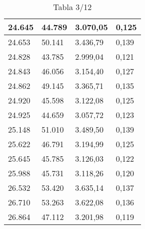 \begin{table}[H]
{\begin{tabular}{| l | l | l |l |}
24.645	&	44.789	&	3.070,05	&	0,125	\\ \hline
24.653	&	50.141	&	3.436,79	&	0,139	\\ \hline
24.828	&	43.785	&	2.999,04	&	0,121	\\ \hline
24.843	&	46.056	&	3.154,40	&	0,127	\\ \hline
24.862	&	49.145	&	3.365,71	&	0,135	\\ \hline
24.920	&	45.598	&	3.122,08	&	0,125	\\ \hline
24.925	&	44.659	&	3.057,72	&	0,123	\\ \hline
25.148	&	51.010	&	3.489,50	&	0,139	\\ \hline
25.622	&	46.791	&	3.194,99	&	0,125	\\ \hline
25.645	&	45.785	&	3.126,03	&	0,122	\\ \hline
25.988	&	45.731	&	3.118,26	&	0,120	\\ \hline
26.532	&	53.420	&	3.635,14	&	0,137	\\ \hline
26.710	&	53.263	&	3.622,08	&	0,136	\\ \hline
26.864	&	47.112	&	3.201,98	&	0,119	\\ \hline
  \end{tabular}
  \caption*{Tabla 3/12}
}
\end{table}
